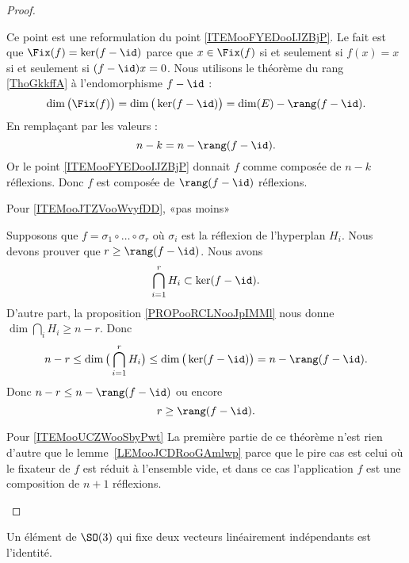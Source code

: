 \begin{proof}
\begin{subproof}
		Ce point est une reformulation du point \ref{ITEMooFYEDooIJZBjP}. Le fait est que \( \Fix(f)=\ker(f-\id)\) parce que \( x\in\Fix(f)\) si et seulement si \( f(x)=x\) si et seulement si \( (f-\id)x=0\). Nous utilisons le théorème du rang \ref{ThoGkkffA} à l'endomorphisme \( f-\id\) :
		\begin{equation}
			\dim\big( \Fix(f) \big)=\dim\big( \ker(f-\id) \big)=\dim(E)-\rang(f-\id).
		\end{equation}
		En remplaçant par les valeurs :
		\begin{equation}
			n-k=n-\rang(f-\id).
		\end{equation}
		Or le point \ref{ITEMooFYEDooIJZBjP} donnait \( f\) comme composée de \( n-k\) réflexions. Donc \( f\) est composée de \( \rang(f-\id)\) réflexions.
		\item[Pour \ref{ITEMooJTZVooWvyfDD}, «pas moins»]

		Supposons que \( f=\sigma_1\circ\ldots \circ \sigma_r\) où \( \sigma_i\) est la réflexion de l'hyperplan \( H_i\). Nous devons prouver que \( r\geq \rang(f-\id)\). Nous avons
		\begin{equation}
			\bigcap_{i=1}^rH_i\subset \ker(f-\id).
		\end{equation}
		D'autre part, la proposition \ref{PROPooRCLNooJpIMMl} nous donne \( \dim\bigcap_iH_i\geq n-r\). Donc
		\begin{equation}
			n-r\leq \dim\big( \bigcap_{i=1}^r H_i\big)\leq\dim\big( \ker(f-\id) \big)=n-\rang(f-\id).
		\end{equation}
		Donc \( n-r\leq n-\rang(f-\id)\) ou encore
		\begin{equation}
			r\geq \rang(f-\id).
		\end{equation}

		\item[Pour \ref{ITEMooUCZWooSbyPwt}]
		La première partie de ce théorème n'est rien d'autre que le lemme~\ref{LEMooJCDRooGAmlwp} parce que le pire cas est celui où le fixateur de \( f\) est réduit à l'ensemble vide, et dans ce cas l'application \( f\) est une composition de \( n+1\) réflexions.
	\end{subproof}
\end{proof}

\begin{proposition}     \label{PROPooUSKEooUbNVfs}
	Un élément de \( \SO(3)\) qui fixe deux vecteurs linéairement indépendants est l'identité.
\end{proposition}

